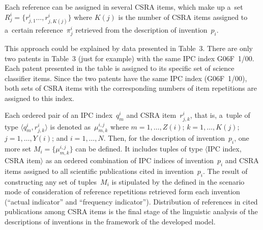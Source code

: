 \begin{multicols}{2}
    Each reference can be assigned in several CSRA items, which make up a~set 
$R_j^i=\{ r^i_{j,1}\ldots , r^i_{j,K(j)}\}$ where $K(j)$ is the number of CSRA 
items assigned to a~certain reference~$\pi^i_j$ retrieved from the description of 
invention~$p_i$.
    
    This approach could be explained by data presented in Table~3. There are only 
two patents in Table~3 (just for example) with the same IPC index G06F~1/00. Each 
patent presented in the table is assigned to its specific set of science classifier items. 
Since the two patents have the same IPC index (G06F~1/00), both sets of CSRA 
items with the corresponding numbers of item repetitions are assigned to this index.
    
    
    
    
    
    Each ordered pair of an IPC index~$q_m^i$ and CSRA item~$r^i_{j,k}$, that 
is, a~tuple of type $\langle q^i_m, r^i_{j,k}\rangle$ is denoted as~$\mu^{i,j}_{m,k}$ 
where $m = 1, \ldots , Z(i)$; $k = 1, \ldots , K(j)$; $j = 1, \ldots , Y(i)$; and 
$i = 1, \ldots , 
N$. Then, for the description of invention~$p_i$, one more set $M_i= 
\{\mu^{i,j}_{m,k}\}$ can be defined. It includes tuples of type $\langle$IPC index, CSRA 
item$\rangle$ as an ordered combination of IPC indices of invention~$p_i$ and 
CSRA items assigned to all scientific publications cited in invention~$p_i$. The 
result of constructing any set of tuples~$M_i$ is stipulated by the defined in the 
scenario mode of consideration of reference repetitions retrieved form each invention 
(``actual indicator'' and ``frequency indicator''). Distribution of references in cited 
publications among CSRA items is the final stage of the linguistic analysis of the 
descriptions of inventions in the framework of the developed model.

 \begin{table*}\small %
    \begin{center}
\vspace*{2ex}


\end{center}
\end{table*}
\end{multicols}
